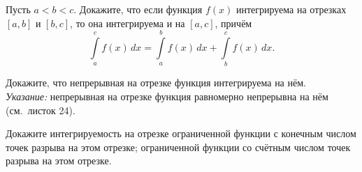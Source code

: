 \documentclass[a4paper, 11pt]{article}
\newcommand{\0}[1]{\overline{#1}}
\begin{document}
 Пусть  $a<b<c$. Докажите, что
если функция $f(x)$ интегрируема на отрезках $[a,b]$ и $[b,c]$, то она интегрируема и на
$[a,c]$, прич\"ем
$$\int\limits_a^c f(x)\,dx=\int\limits_a^b f(x)\,dx+
 \int\limits_b^c f(x)\,dx.$$


Докажите, что непрерывная на отрезке функция интегрируема на н\"ем.\\
{\it Указание:} непрерывная на отрезке функция равномерно непрерывна на н\"ем (см.~листок 24).

Докажите интегрируемость на отрезке
 ограниченной функции с конечным числом точек разрыва на этом
отрезке;
 ограниченной функции со сч\"етным числом точек разрыва на этом
отрезке.





\end{document}
